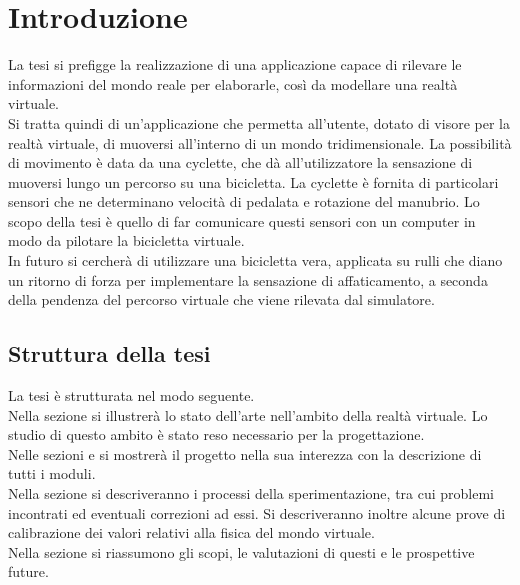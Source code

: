 \chapter{Introduzione}
\label{Introduzione}

\noindent La tesi si prefigge la realizzazione di una applicazione capace di rilevare le informazioni del mondo reale per elaborarle, così da modellare una realtà virtuale.\\

\noindent Si tratta quindi di un'applicazione che permetta all’utente, dotato di visore per la realtà virtuale, di muoversi all’interno di un mondo tridimensionale. La possibilità di movimento è data da una cyclette, che dà all'utilizzatore la sensazione di muoversi lungo un percorso su una bicicletta. La cyclette è fornita di particolari sensori che ne determinano velocità di pedalata e rotazione del manubrio. Lo scopo della tesi è quello di far comunicare questi sensori con un computer in modo da pilotare la bicicletta virtuale.\\

\noindent In futuro si cercherà di utilizzare una bicicletta vera, applicata su rulli che diano un ritorno di forza per implementare la sensazione di affaticamento, a seconda della pendenza del percorso virtuale che viene rilevata dal simulatore.
\newpage
\section{Struttura della tesi}
\noindent La tesi è strutturata nel modo seguente.\\
Nella sezione \textit{} si illustrerà lo stato dell'arte nell'ambito della realtà virtuale. Lo studio di questo ambito è stato reso necessario per la progettazione.\\
\noindent Nelle sezioni \textit{} e \textit{} si mostrerà il progetto nella sua interezza con la descrizione di tutti i moduli.\\
\noindent Nella sezione \textit{} si descriveranno i processi della sperimentazione, tra cui problemi incontrati ed eventuali correzioni ad essi. Si descriveranno inoltre alcune prove di calibrazione dei valori relativi alla fisica del mondo virtuale.\\
\noindent Nella sezione \textit{} si riassumono gli scopi, le valutazioni di questi e le prospettive future.







